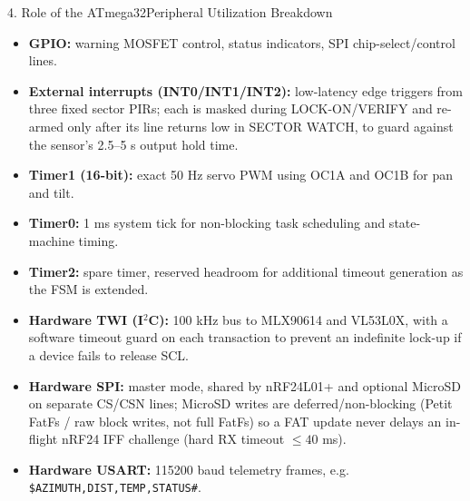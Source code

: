 \documentclass[aspectratio=169, 10pt]{beamer}
\begin{document}
\begin{frame}{4. Role of the ATmega32}{Peripheral Utilization Breakdown}
    \footnotesize
    \begin{itemize}
        \item \textbf{GPIO:} warning MOSFET control, status indicators, SPI chip-select/control lines.
        \item \textbf{External interrupts (INT0/INT1/INT2):} low-latency edge triggers from three fixed sector PIRs; each is masked during LOCK-ON/VERIFY and re-armed only after its line returns low in SECTOR WATCH, to guard against the sensor's 2.5--5 s output hold time.
        \item \textbf{Timer1 (16-bit):} exact 50 Hz servo PWM using OC1A and OC1B for pan and tilt.
        \item \textbf{Timer0:} 1 ms system tick for non-blocking task scheduling and state-machine timing.
        \item \textbf{Timer2:} spare timer, reserved headroom for additional timeout generation as the FSM is extended.
        \item \textbf{Hardware TWI (I$^2$C):} 100 kHz bus to MLX90614 and VL53L0X, with a software timeout guard on each transaction to prevent an indefinite lock-up if a device fails to release SCL.
        \item \textbf{Hardware SPI:} master mode, shared by nRF24L01+ and optional MicroSD on separate CS/CSN lines; MicroSD writes are deferred/non-blocking (Petit FatFs / raw block writes, not full FatFs) so a FAT update never delays an in-flight nRF24 IFF challenge (hard RX timeout $\le 40$ ms).
        \item \textbf{Hardware USART:} 115200 baud telemetry frames, e.g. \texttt{\$AZIMUTH,DIST,TEMP,STATUS\#}.
    \end{itemize}
\end{frame}
\end{document}
